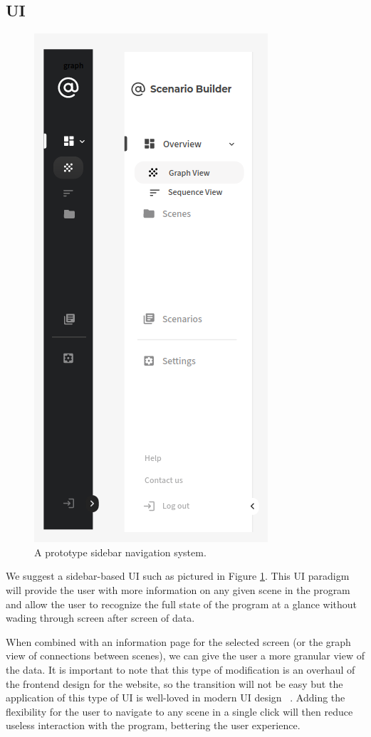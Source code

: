 \documentclass[sigart]{acmart_mod} %
\begin{document}
\subsection{UI}
\begin{figure}
  \begin{center}
  \includegraphics[scale=0.4]{media/sidebar.png}
  \end{center}
\caption{A prototype sidebar navigation system.}\label{fig1}
\end{figure}
We suggest a sidebar-based UI such as pictured in Figure \ref{fig1}. This UI paradigm will provide the user with more information on any given scene in the program and allow the user to recognize the full state of the program at a glance without wading through screen after screen of data.

When combined with an information page for the selected screen (or the graph view of connections between scenes), we can give the user a more granular view of the data. It is important to note that this type of modification is an overhaul of the frontend design for the website, so the transition will not be easy but the application of this type of UI is well-loved in modern UI design~\cite{YourConnectedWorkspace} \cite{SupabaseOpenSource} \cite{FlutterBuildApps}. Adding the flexibility for the user to navigate to any scene in a single click will then reduce useless interaction with the program, bettering the user experience.
\end{document}
